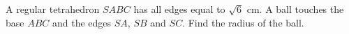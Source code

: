 A regular tetrahedron $SABC$ has all edges equal to $\sqrt6$ cm. A ball touches the base $ABC$ and the edges $SA$, $SB$ and $SC$. Find the radius of the ball.
